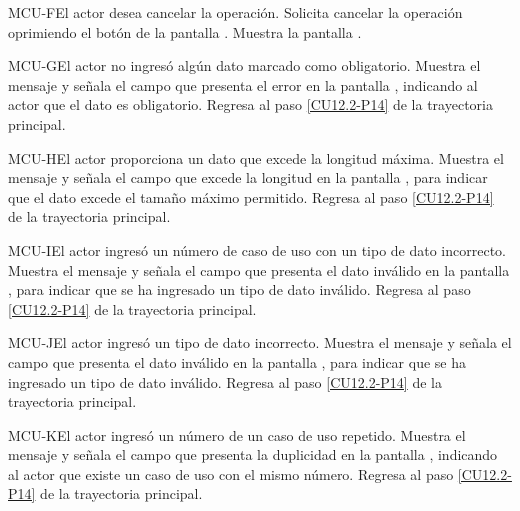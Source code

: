 	\begin{UCtrayectoriaA}{MCU-F}{El actor desea cancelar la operación.}
		\UCpaso[\UCactor] Solicita cancelar la operación oprimiendo el botón  de la pantalla .
		\UCpaso[\UCsist] Muestra la pantalla .
	\end{UCtrayectoriaA}

	\begin{UCtrayectoriaA}{MCU-G}{El actor no ingresó algún dato marcado como obligatorio.}
		\UCpaso[\UCsist] Muestra el mensaje  y señala el campo que presenta el error en la pantalla , indicando al actor que el dato es obligatorio.
		\UCpaso Regresa al paso \ref{CU12.2-P14} de la trayectoria principal.
	\end{UCtrayectoriaA}

	\begin{UCtrayectoriaA}{MCU-H}{El actor proporciona un dato que excede la longitud máxima.}
		\UCpaso[\UCsist] Muestra el mensaje  y señala el campo que excede la longitud en la pantalla , para indicar que el dato excede el tamaño máximo permitido.
		\UCpaso Regresa al paso \ref{CU12.2-P14} de la trayectoria principal.
	\end{UCtrayectoriaA}

	\begin{UCtrayectoriaA}{MCU-I}{El actor ingresó un número de caso de uso con un tipo de dato incorrecto.}
		\UCpaso[\UCsist] Muestra el mensaje  y señala el campo que presenta el dato inválido en la pantalla , para indicar que se ha ingresado un tipo de dato inválido.
		\UCpaso Regresa al paso \ref{CU12.2-P14} de la trayectoria principal.
	\end{UCtrayectoriaA}

	\begin{UCtrayectoriaA}{MCU-J}{El actor ingresó un tipo de dato incorrecto.}
		\UCpaso[\UCsist] Muestra el mensaje  y señala el campo que presenta el dato inválido en la pantalla , para indicar que se ha ingresado un tipo de dato inválido.
		\UCpaso Regresa al paso \ref{CU12.2-P14} de la trayectoria principal.
	\end{UCtrayectoriaA}

	\begin{UCtrayectoriaA}{MCU-K}{El actor ingresó un número de un caso de uso repetido.}
		\UCpaso[\UCsist] Muestra el mensaje  y señala el campo que presenta la duplicidad en la pantalla , indicando al actor que existe un caso de uso con el mismo número.
		\UCpaso Regresa al paso \ref{CU12.2-P14} de la trayectoria principal.
	\end{UCtrayectoriaA}
	
